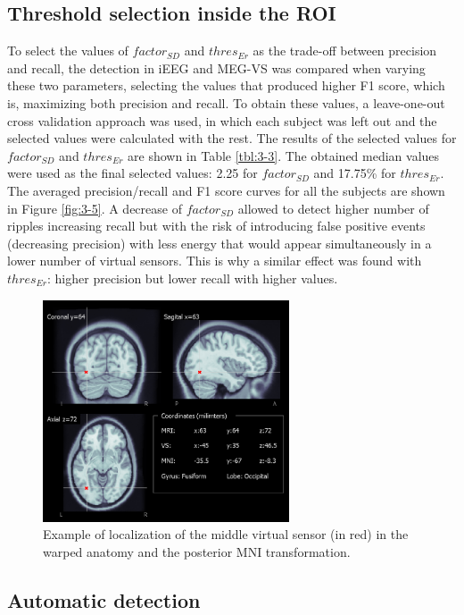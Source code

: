 \subsection{Threshold selection inside the ROI}

To select the values of $factor_{SD}$ and $thres_{Er}$ as the trade-off between precision and recall, the detection in iEEG and MEG-VS was compared when varying these two parameters, selecting the values that produced higher F1 score, which is, maximizing both precision and recall.  To obtain these values, a leave-one-out cross validation approach was used, in which each subject was left out and the selected values were calculated with the rest. The results of the selected values for $factor_{SD}$ and $thres_{Er}$ are shown in Table \ref{tbl:3-3}. The obtained median values were used as the final selected values: 2.25 for $factor_{SD}$ and 17.75\% for $thres_{Er}$. The averaged precision/recall and F1 score curves for all the subjects are shown in Figure \ref{fig:3-5}. A decrease of $factor_{SD}$ allowed to detect higher number of ripples increasing recall but with the risk of introducing false positive events (decreasing precision) with less energy that would appear simultaneously in a lower number of virtual sensors. This is why a similar effect was found with $thres_{Er}$: higher precision but lower recall with higher values.


\begin{figure}[h]
\centering
\includegraphics[width=0.65\textwidth]{Images/fig3-4.png}
\caption{Example of localization of the middle virtual sensor (in red) in the warped anatomy and the posterior MNI transformation.}
\label{fig:3-4}
\end{figure}


\subsection{Automatic detection}

